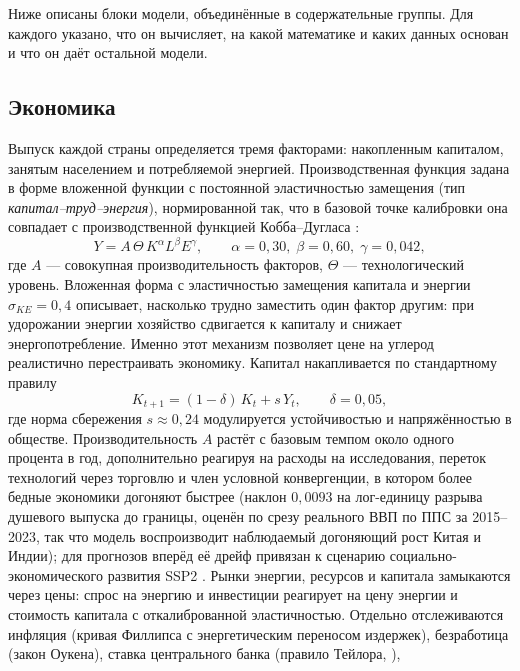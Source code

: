\documentclass[11pt,a4paper]{article}
\begin{document}
Ниже описаны блоки модели, объединённые в содержательные группы. Для каждого указано,
что он вычисляет, на какой математике и каких данных основан и что он даёт остальной
модели.

\subsection{Экономика}

Выпуск каждой страны определяется тремя факторами: накопленным капиталом, занятым
населением и потребляемой энергией. Производственная функция задана в форме вложенной
функции с постоянной эластичностью замещения (тип \emph{капитал--труд--энергия}),
нормированной так, что в базовой точке калибровки она совпадает с производственной
функцией Кобба--Дугласа \citep{arrow1961}:
\begin{equation}
Y = A \, \Theta \, K^{\alpha} L^{\beta} E^{\gamma},
\qquad \alpha = 0{,}30,\; \beta = 0{,}60,\; \gamma = 0{,}042,
\label{eq:prod}
\end{equation}
где $A$ --- совокупная производительность факторов, $\Theta$ --- технологический
уровень. Вложенная форма с эластичностью замещения капитала и энергии $\sigma_{KE}=0{,}4$
описывает, насколько трудно заместить один фактор другим: при удорожании энергии хозяйство
сдвигается к капиталу и снижает энергопотребление. Именно этот механизм позволяет цене на
углерод реалистично перестраивать экономику. Капитал накапливается по стандартному
правилу
\begin{equation}
K_{t+1} = (1-\delta)\,K_t + s\,Y_t, \qquad \delta = 0{,}05,
\label{eq:capital}
\end{equation}
где норма сбережения $s\approx0{,}24$ модулируется устойчивостью и напряжённостью в
обществе. Производительность $A$ растёт с базовым темпом около одного процента в год,
дополнительно реагируя на расходы на исследования, переток технологий через торговлю и
член условной конвергенции, в котором более бедные экономики догоняют быстрее (наклон $0{,}0093$ на
лог-единицу разрыва душевого выпуска до границы, оценён по срезу реального ВВП по ППС за 2015--2023,
так что модель воспроизводит наблюдаемый догоняющий рост Китая и Индии); для прогнозов вперёд её
дрейф привязан к сценарию социально-экономического развития SSP2 \citep{riahi2017}. Рынки энергии,
ресурсов и капитала замыкаются через цены: спрос на энергию и инвестиции реагирует на
цену энергии и стоимость капитала с откалиброванной эластичностью. Отдельно
отслеживаются инфляция (кривая Филлипса с энергетическим переносом издержек),
безработица (закон Оукена), ставка центрального банка (правило Тейлора, \citep{taylor1993}),
\end{document}
